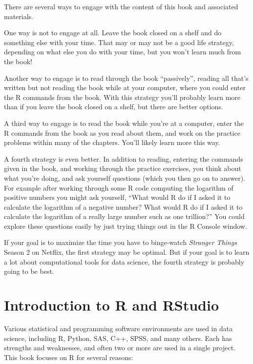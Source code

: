 \documentclass[
]{krantz}
\begin{document}
There are several ways to engage with the content of this book and associated materials.

One way is not to engage at all. Leave the book closed on a shelf and do something else with your time. That may or may not be a good life strategy, depending on what else you do with your time, but you won't learn much from the book!

Another way to engage is to read through the book ``passively'', reading all that's written but not reading the book while at your computer, where you could enter the R commands from the book. With this strategy you'll probably learn more than if you leave the book closed on a shelf, but there are better options.

A third way to engage is to read the book while you're at a computer, enter the R commands from the book as you read about them, and work on the practice problems within many of the chapters. You'll likely learn more this way.

A fourth strategy is even better. In addition to reading, entering the commands given in the book, and working through the practice exercises, you think about what you're doing, and ask yourself questions (which you then go on to answer). For example after working through some R code computing the logarithm of positive numbers you might ask yourself, ``What would R do if I asked it to calculate the logarithm of a negative number? What would R do if I asked it to calculate the logarithm of a really large number such as one trillion?'' You could explore these questions easily by just trying things out in the R Console window.

If your goal is to maximize the time you have to binge-watch \emph{Stranger Things} Season 2 on Netflix, the first strategy may be optimal. But if your goal is to learn a lot about computational tools for data science, the fourth strategy is probably going to be best.

\hypertarget{introduction-to-r-and-rstudio}{%
\chapter{Introduction to R and RStudio}\label{introduction-to-r-and-rstudio}}

Various statistical and programming software environments are used in data science, including R, Python, SAS, C++, SPSS, and many others. Each has strengths and weaknesses, and often two or more are used in a single project. This book focuses on R for several reasons:
\end{document}
